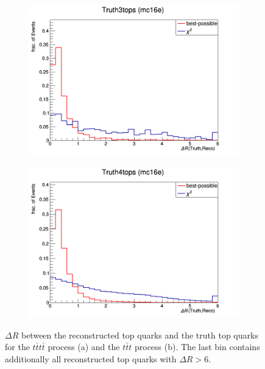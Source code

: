 \newpage

\begin{figure}[H]
\begin{subfigure}{.5\textwidth}
  \centering
  \includegraphics[width=.99\linewidth]{figs/HadTop/Chi3tops}
  \caption{}
  \label{fig:dR3}
\end{subfigure}%
\begin{subfigure}{.5\textwidth}
  \centering
  \includegraphics[width=.99\linewidth]{figs/HadTop/Chi4tops}
  \caption{}
  \label{fig:dR4}
\end{subfigure}
\caption{$\Delta R$ between the reconstructed top quarks and the truth top quarks for the $t\bar{t}t\bar{t}$ process (a) and the $t\bar{t}t$ process (b). The last bin contains additionally all reconstructed top quarks with $\Delta R > 6$.}
\label{fig:dR}
\end{figure}

